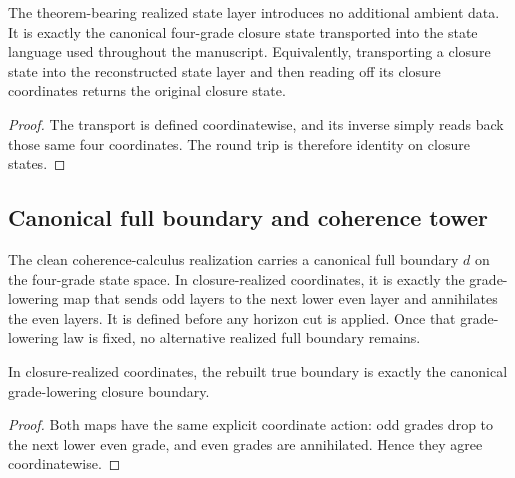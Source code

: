 \begin{theorem}
\label{thm:state-transport}
The theorem-bearing realized state layer introduces no additional ambient data.
It is exactly the canonical four-grade closure state transported into the state
language used throughout the manuscript. Equivalently, transporting a closure
state into the reconstructed state layer and then reading off its closure
coordinates returns the original closure state.
\end{theorem}

\begin{proof}
The transport is defined coordinatewise, and its inverse simply reads back
those same four coordinates. The round trip is therefore identity on closure
states.
\end{proof}

\subsection{Canonical full boundary and coherence tower}

\begin{definition}\label{def:true-boundary}
The clean coherence-calculus realization carries a canonical full boundary $d$
on the four-grade state space. In closure-realized coordinates, it is exactly
the grade-lowering map that sends odd layers to the next lower even layer and
annihilates the even layers. It is defined before any horizon cut is applied.
Once that grade-lowering law is fixed, no alternative realized full boundary
remains.
\end{definition}

\begin{theorem}\label{thm:true-boundary-realized}
In closure-realized coordinates, the rebuilt true boundary is exactly the
canonical grade-lowering closure boundary.
\end{theorem}

\begin{proof}
Both maps have the same explicit coordinate action: odd grades drop to the next
lower even grade, and even grades are annihilated. Hence they agree
coordinatewise.
\end{proof}


